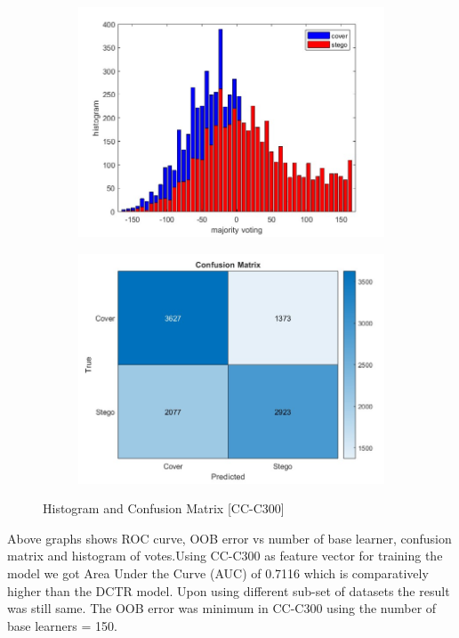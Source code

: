 \begin{figure}[H]
    \begin{subfigure}[b]{0.5\textwidth}
        \includegraphics[width=\textwidth]{img/histo300.jpg}
    \end{subfigure}
    \hfill
    \begin{subfigure}[b]{0.5\textwidth}
        \includegraphics[width=\textwidth]{img/confusion300.jpg}
    \end{subfigure}
    \caption{Histogram and Confusion Matrix [CC-C300]}
\end{figure}
Above graphs shows ROC curve, OOB error vs number of base learner, confusion matrix and histogram of votes.Using CC-C300 as feature vector for training the model we got Area Under the Curve (AUC) of 0.7116 which is comparatively higher than the DCTR model. Upon using different sub-set of datasets the result was still same. The OOB error was minimum in CC-C300 using the number of base learners = 150.
\clearpage

